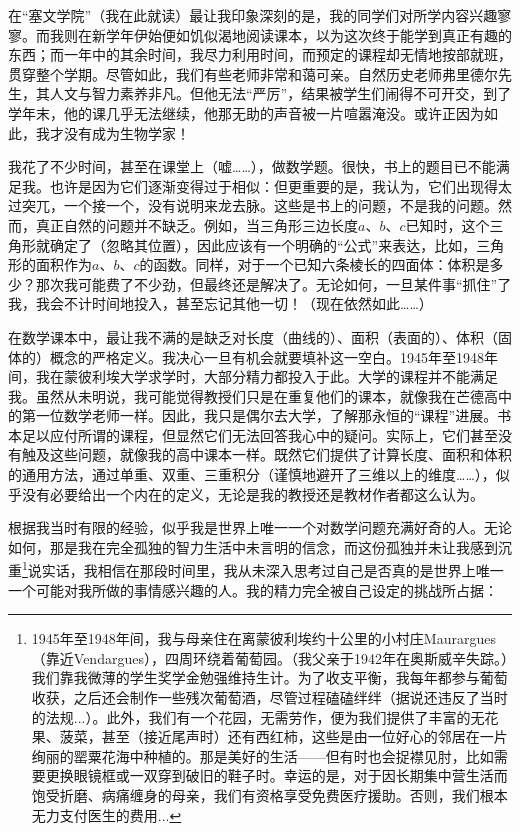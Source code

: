 在“塞文学院”（我在此就读）最让我印象深刻的是，我的同学们对所学内容兴趣寥寥。而我则在新学年伊始便如饥似渴地阅读课本，以为这次终于能学到真正有趣的东西；而一年中的其余时间，我尽力利用时间，而预定的课程却无情地按部就班，贯穿整个学期。尽管如此，我们有些老师非常和蔼可亲。自然历史老师弗里德尔先生，其人文与智力素养非凡。但他无法“严厉”，结果被学生们闹得不可开交，到了学年末，他的课几乎无法继续，他那无助的声音被一片喧嚣淹没。或许正因为如此，我才没有成为生物学家！

我花了不少时间，甚至在课堂上（嘘……），做数学题。很快，书上的题目已不能满足我。也许是因为它们逐渐变得过于相似：但更重要的是，我认为，它们出现得太过突兀，一个接一个，没有说明来龙去脉。这些是书上的问题，不是我的问题。然而，真正自然的问题并不缺乏。例如，当三角形三边长度$a$、$b$、$c$已知时，这个三角形就确定了（忽略其位置），因此应该有一个明确的“公式”来表达，比如，三角形的面积作为$a$、$b$、$c$的函数。同样，对于一个已知六条棱长的四面体：体积是多少？那次我可能费了不少劲，但最终还是解决了。无论如何，一旦某件事“抓住”了我，我会不计时间地投入，甚至忘记其他一切！（现在依然如此……）

在数学课本中，最让我不满的是缺乏对长度（曲线的）、面积（表面的）、体积（固体的）概念的严格定义。我决心一旦有机会就要填补这一空白。1945年至1948年间，我在蒙彼利埃大学求学时，大部分精力都投入于此。大学的课程并不能满足我。虽然从未明说，我可能觉得教授们只是在重复他们的课本，就像我在芒德高中的第一位数学老师一样。因此，我只是偶尔去大学，了解那永恒的“课程”进展。书本足以应付所谓的课程，但显然它们无法回答我心中的疑问。实际上，它们甚至没有触及这些问题，就像我的高中课本一样。既然它们提供了计算长度、面积和体积的通用方法，通过单重、双重、三重积分（谨慎地避开了三维以上的维度……），似乎没有必要给出一个内在的定义，无论是我的教授还是教材作者都这么认为。

根据我当时有限的经验，似乎我是世界上唯一一个对数学问题充满好奇的人。无论如何，那是我在完全孤独的智力生活中未言明的信念，而这份孤独并未让我感到沉重\footnote{
    1945年至1948年间，我与母亲住在离蒙彼利埃约十公里的小村庄Maurargues（靠近Vendargues），四周环绕着葡萄园。（我父亲于1942年在奥斯威辛失踪。）我们靠我微薄的学生奖学金勉强维持生计。为了收支平衡，我每年都参与葡萄收获，之后还会制作一些残次葡萄酒，尽管过程磕磕绊绊（据说还违反了当时的法规...）。此外，我们有一个花园，无需劳作，便为我们提供了丰富的无花果、菠菜，甚至（接近尾声时）还有西红柿，这些是由一位好心的邻居在一片绚丽的罂粟花海中种植的。那是美好的生活——但有时也会捉襟见肘，比如需要更换眼镜框或一双穿到破旧的鞋子时。幸运的是，对于因长期集中营生活而饱受折磨、病痛缠身的母亲，我们有资格享受免费医疗援助。否则，我们根本无力支付医生的费用...
}说实话，我相信在那段时间里，我从未深入思考过自己是否真的是世界上唯一一个可能对我所做的事情感兴趣的人。我的精力完全被自己设定的挑战所占据：

